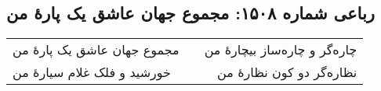 \begin{center}
\section*{رباعی شماره ۱۵۰۸: مجموع جهان عاشق یک پارهٔ من}
\label{sec:1508}
\begin{longtable}{l p{0.5cm} r}
مجموع جهان عاشق یک پارهٔ من
&&
چاره‌گر و چاره‌ساز بیچارهٔ من
\\
خورشید و فلک غلام سیارهٔ من
&&
نظاره‌گر دو کون نظارهٔ من
\\
\end{longtable}
\end{center}

